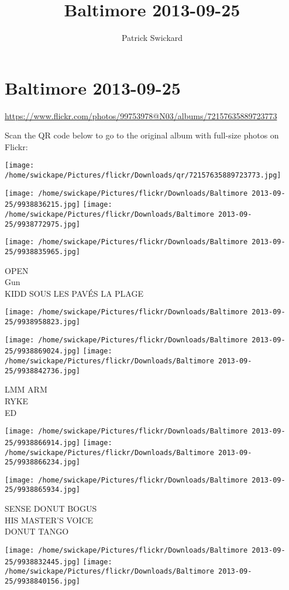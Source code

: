 \documentclass[10pt,letterpaper]{article}
\title{Baltimore 2013-09-25}
\author{Patrick Swickard}
\date{}
\begin{document}
\section*{Baltimore 2013-09-25}

\url{https://www.flickr.com/photos/99753978@N03/albums/72157635889723773}

Scan the QR code below to go to the original album with full-size photos on Flickr:

\texttt{[image: /home/swickape/Pictures/flickr/Downloads/qr/72157635889723773.jpg]}
\pagebreak

\texttt{[image: /home/swickape/Pictures/flickr/Downloads/Baltimore 2013-09-25/9938836215.jpg]}
\texttt{[image: /home/swickape/Pictures/flickr/Downloads/Baltimore 2013-09-25/9938772975.jpg]}

\vspace{0.25in}
\texttt{[image: /home/swickape/Pictures/flickr/Downloads/Baltimore 2013-09-25/9938835965.jpg]}

OPEN\\
Gun\\
KIDD SOUS LES PAVÉS LA PLAGE
\pagebreak

\texttt{[image: /home/swickape/Pictures/flickr/Downloads/Baltimore 2013-09-25/9938958823.jpg]}

\vspace{0.25in}
\texttt{[image: /home/swickape/Pictures/flickr/Downloads/Baltimore 2013-09-25/9938869024.jpg]}
\texttt{[image: /home/swickape/Pictures/flickr/Downloads/Baltimore 2013-09-25/9938842736.jpg]}

LMM ARM\\
RYKE\\
ED
\pagebreak

\texttt{[image: /home/swickape/Pictures/flickr/Downloads/Baltimore 2013-09-25/9938866914.jpg]}
\texttt{[image: /home/swickape/Pictures/flickr/Downloads/Baltimore 2013-09-25/9938866234.jpg]}

\vspace{0.25in}
\texttt{[image: /home/swickape/Pictures/flickr/Downloads/Baltimore 2013-09-25/9938865934.jpg]}

SENSE DONUT BOGUS\\
HIS MASTER'S VOICE\\
DONUT TANGO
\pagebreak

\texttt{[image: /home/swickape/Pictures/flickr/Downloads/Baltimore 2013-09-25/9938832445.jpg]}
\texttt{[image: /home/swickape/Pictures/flickr/Downloads/Baltimore 2013-09-25/9938840156.jpg]}
\end{document}
